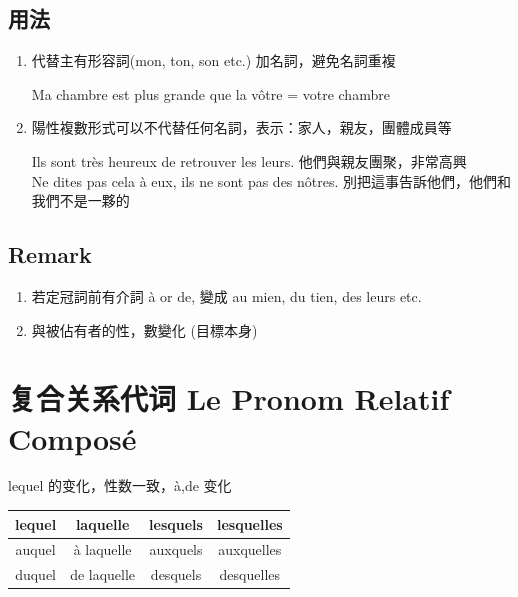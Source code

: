 \documentclass{book}
\begin{document}
        \subsection{用法}
            \begin{enumerate}
                \item 代替主有形容詞(mon, ton, son etc.) 加名詞，避免名詞重複
                    \begin{center}
                        Ma chambre est plus grande que la vôtre = votre chambre
                    \end{center}
                \item 陽性複數形式可以不代替任何名詞，表示：家人，親友，團體成員等
                    \begin{center}
                        Ils sont très heureux de retrouver les leurs. 他們與親友團聚，非常高興
                        \\
                        Ne dites pas cela à eux, ils ne sont pas des nôtres. 別把這事告訴他們，他們和我們不是一夥的
                    \end{center}
            \end{enumerate}
        
        \subsection{Remark}
            \begin{enumerate}
                \item 若定冠詞前有介詞 à or de, 變成 au mien, du tien, des leurs etc.
                \item 與被佔有者的性，數變化 (目標本身)
            \end{enumerate}

    \section{复合关系代词 Le Pronom Relatif Composé}
        lequel 的变化，性数一致，à,de 变化
        \begin{tabular}{|c|c|c|c|}
            \hline
            lequel & laquelle & lesquels & lesquelles \\
            \hline
            auquel & à laquelle & auxquels & auxquelles \\
            \hline
            duquel & de laquelle & desquels & desquelles \\
            \hline
        \end{tabular}
\end{document}

